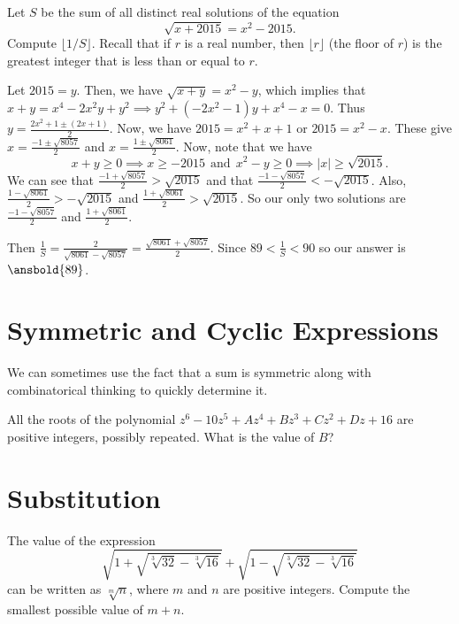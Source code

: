 \documentclass[mast]{lucky}
\begin{document}
\begin{exam}{6}
Let $S$ be the sum of all distinct real solutions of the equation 
\[\sqrt{x + 2015} = x^2 - 2015.\]
Compute $\lfloor 1/S \rfloor$.  Recall that if $r$ is a real number, then $\lfloor r \rfloor$ (the floor of $r$) is the greatest integer that is less than or equal to $r$.
\end{exam}

\begin{sol}
Let $2015=y$. Then, we have $\sqrt{x+y}=x^2-y$, which implies that $x+y=x^4-2x^2y+y^2\implies y^2+(-2x^2-1)y+x^4-x=0$. Thus $y=\frac{2x^2+1 \pm (2x+1)}{2}$. Now, we have $2015=x^2+x+1$ or $2015=x^2-x$. These give $x=\frac{-1 \pm \sqrt{8057}}{2}$ and $x=\frac{1 \pm \sqrt{8061}}{2}$. Now, note that we have
\[x+y\ge 0 \implies x \ge -2015~~\text{and}~~x^2-y\ge 0\implies |x|\ge \sqrt{2015}.\]
We can see that $\frac{-1 + \sqrt{8057}}{2}>\sqrt{2015}$ and that $\frac{-1-\sqrt{8057}}{2} < -\sqrt{2015}$. Also, $\frac{1-\sqrt{8061}}{2} > - \sqrt{2015}$ and $\frac{1+\sqrt{8061}}{2} > \sqrt{2015}$. So our only two solutions are $\frac{-1-\sqrt{8057}}{2}$ and $\frac{1+\sqrt{8061}}{2}$.

Then $\frac{1}{S}=\frac{2}{\sqrt{8061}-\sqrt{8057}}=\frac{\sqrt{8061}+\sqrt{8057}}{2}$. Since $89 < \frac{1}{S} < 90$ so our answer is $\ansbold{89}$.
\end{sol}

\section{Symmetric and Cyclic Expressions}
We can sometimes use the fact that a sum is symmetric along with combinatorical thinking to quickly determine it.

\begin{exam}[AMC 10A 2021/14]
All the roots of the polynomial $z^6-10z^5+Az^4+Bz^3+Cz^2+Dz+16$ are positive integers, possibly repeated. What is the value of $B$?
\end{exam}

\section{Substitution}

\begin{exam}[NEMO 2017]
The value of the expression
\[\sqrt{1+\sqrt{\sqrt[3]{32}-\sqrt[3]{16}}} + \sqrt{1-\sqrt{\sqrt[3]{32}-\sqrt[3]{16}}}\]
can be written as $\sqrt[m]{n}$, where $m$ and $n$ are positive integers. Compute the smallest possible value of
$m + n$.
\end{exam}
\end{document}

